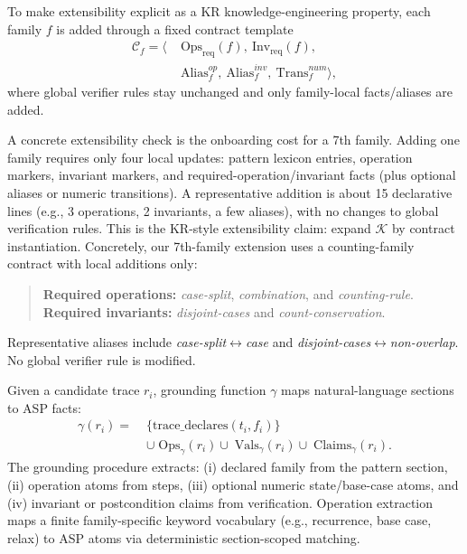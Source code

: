 \documentclass{article}
\begin{document}
To make extensibility explicit as a KR knowledge-engineering property, each family \(f\) is added through a fixed contract template
\begin{equation}
\label{eq:family-contract}
\begin{aligned}
\mathcal{C}_f=\langle\;&\mathrm{Ops}_{\mathrm{req}}(f),\ \mathrm{Inv}_{\mathrm{req}}(f),\\
&\mathrm{Alias}^{op}_f,\ \mathrm{Alias}^{inv}_f,\ \mathrm{Trans}^{num}_f\rangle,
\end{aligned}
\end{equation}
where global verifier rules stay unchanged and only family-local facts/aliases are added.

A concrete extensibility check is the onboarding cost for a 7th family. Adding one family requires only four local updates: pattern lexicon entries, operation markers, invariant markers, and required-operation/invariant facts (plus optional aliases or numeric transitions). A representative addition is about 15 declarative lines (e.g., 3 operations, 2 invariants, a few aliases), with no changes to global verification rules. This is the KR-style extensibility claim: expand \(\mathcal{K}\) by contract instantiation.
Concretely, our 7th-family extension uses a counting-family contract with local additions only:
\begin{quote}
\small
\textbf{Required operations:} \emph{case-split}, \emph{combination}, and \emph{counting-rule}.\\
\textbf{Required invariants:} \emph{disjoint-cases} and \emph{count-conservation}.
\end{quote}
Representative aliases include \emph{case-split}\(\leftrightarrow\)\emph{case} and \emph{disjoint-cases}\(\leftrightarrow\)\emph{non-overlap}. No global verifier rule is modified.

Given a candidate trace \(r_i\), grounding function \(\gamma\) maps natural-language sections to ASP facts:
\begin{equation}
\label{eq:grounding}
\begin{aligned}
\gamma(r_i)=\;&\{\mathrm{trace\_declares}(t_i,f_i)\} \\
&\cup\; \mathrm{Ops}_\gamma(r_i)
\cup\; \mathrm{Vals}_\gamma(r_i)
\cup\; \mathrm{Claims}_\gamma(r_i).
\end{aligned}
\end{equation}
The grounding procedure extracts: (i) declared family from the pattern section, (ii) operation atoms from steps, (iii) optional numeric state/base-case atoms, and (iv) invariant or postcondition claims from verification. Operation extraction maps a finite family-specific keyword vocabulary (e.g., recurrence, base case, relax) to ASP atoms via deterministic section-scoped matching.
\end{document}
